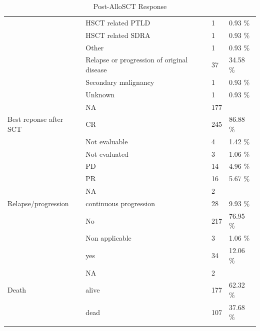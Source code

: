 \documentclass[a4paper,11pt] {article}
\begin{document}
\begin{longtable}{llll}
   & HSCT related PTLD & 1 & 0.93 \% \\ 
   & HSCT related SDRA & 1 & 0.93 \% \\ 
   & Other & 1 & 0.93 \% \\ 
   & Relapse or progression of original disease & 37 & 34.58 \% \\ 
   & Secondary malignancy & 1 & 0.93 \% \\ 
   & Unknown & 1 & 0.93 \% \\ 
   & NA & 177 &  \\ 
  Best reponse after SCT & CR & 245 & 86.88 \% \\ 
   & Not evaluable & 4 & 1.42 \% \\ 
   & Not evaluated & 3 & 1.06 \% \\ 
   & PD & 14 & 4.96 \% \\ 
   & PR & 16 & 5.67 \% \\ 
   & NA & 2 &  \\ 
  Relapse/progression & continuous progression & 28 & 9.93 \% \\ 
   & No & 217 & 76.95 \% \\ 
   & Non applicable  & 3 & 1.06 \% \\ 
   & yes & 34 & 12.06 \% \\ 
   & NA & 2 &  \\ 
  Death & alive & 177 & 62.32 \% \\ 
   & dead & 107 & 37.68 \% \\ 
   \hline
\hline
\caption{Post-AlloSCT Response} 
\label{tab:pg}
\end{longtable}


\pagebreak[4]
\begin{landscape}





\end{landscape}

\restoregeometry
\end{document}
